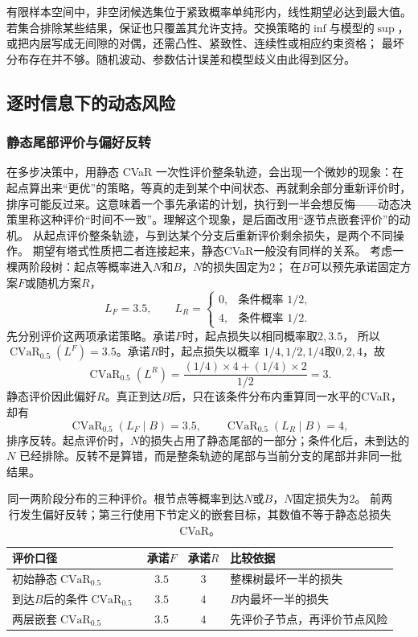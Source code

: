 有限样本空间中，非空闭候选集位于紧致概率单纯形内，线性期望必达到最大值。
若集合排除某些结果，保证也只覆盖其允许支持。交换策略的$\inf$与模型的$\sup$，
或把内层写成无间隙的对偶，还需凸性、紧致性、连续性或相应约束资格；
最坏分布存在并不够。随机波动、参数估计误差和模型歧义由此得到区分。

\subsection{逐时信息下的动态风险}
\label{sec:decision-dynamic-risk-time-consistency}

\subsubsection{静态尾部评价与偏好反转}

在多步决策中，用静态 CVaR 一次性评价整条轨迹，会出现一个微妙的现象：在起点算出来“更优”的策略，等真的走到某个中间状态、再就剩余部分重新评价时，排序可能反过来。这意味着一个事先承诺的计划，执行到一半会想反悔——动态决策里称这种评价“时间不一致”。理解这个现象，是后面改用“逐节点嵌套评价”的动机。
从起点评价整条轨迹，与到达某个分支后重新评价剩余损失，是两个不同操作。
期望有塔式性质把二者连接起来，静态CVaR一般没有同样的关系。
考虑一棵两阶段树：起点等概率进入$N$和$B$，$N$的损失固定为$2$；
在$B$可以预先承诺固定方案$F$或随机方案$R$，
\[
  L_F=3.5,\qquad
  L_R=
  \begin{cases}
    0,&\text{条件概率 }1/2,\\
    4,&\text{条件概率 }1/2.
  \end{cases}
\]
先分别评价这两项承诺策略。承诺$F$时，起点损失以相同概率取$2,3.5$，
所以$\operatorname{CVaR}_{0.5}(L^F)=3.5$。承诺$R$时，起点损失以概率
$1/4,1/2,1/4$取$0,2,4$，故
\[
  \operatorname{CVaR}_{0.5}(L^R)
  =\frac{(1/4)\times4+(1/4)\times2}{1/2}=3.
\]
静态评价因此偏好$R$。真正到达$B$后，只在该条件分布内重算同一水平的CVaR，
却有
\[
  \operatorname{CVaR}_{0.5}(L_F\mid B)=3.5,\qquad
  \operatorname{CVaR}_{0.5}(L_R\mid B)=4,
\]
排序反转。起点评价时，$N$的损失占用了静态尾部的一部分；条件化后，未到达的$N$
已经排除。反转不是算错，而是整条轨迹的尾部与当前分支的尾部并非同一批结果。

\begin{table}[htbp]
  \centering
  \begin{tabularx}{\linewidth}{XccX}
    \toprule
    评价口径 & 承诺$F$ & 承诺$R$ & 比较依据\\
    \midrule
    初始静态$\operatorname{CVaR}_{0.5}$ & $3.5$ & $3$ & 整棵树最坏一半的损失\\
    到达$B$后的条件$\operatorname{CVaR}_{0.5}$ & $3.5$ & $4$ & $B$内最坏一半的损失\\
    两层嵌套$\operatorname{CVaR}_{0.5}$ & $3.5$ & $4$ & 先评价子节点，再评价节点风险\\
    \bottomrule
  \end{tabularx}
  \caption{同一两阶段分布的三种评价。根节点等概率到达$N$或$B$，$N$固定损失为$2$。
  前两行发生偏好反转；第三行使用下节定义的嵌套目标，其数值不等于静态总损失CVaR。}
  \label{tab:decision-static-conditional-nested}
\end{table}

